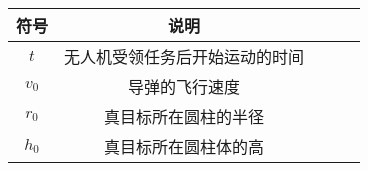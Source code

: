 \documentclass[../main.tex]{subfiles}
\begin{document}




\begin{table}[H]
\centering
\tabcolsep=2cm%
\begin{tabular}{ccccc}
\toprule[1.5pt]
符号 & 说明  \\ 
\midrule[1pt]
$t$            & 无人机受领任务后开始运动的时间            \\
$ v_0 $        & 导弹的飞行速度                          \\
$r_0$          &真目标所在圆柱的半径                      \\
$h_0$          &真目标所在圆柱体的高                      \\
\bottomrule[1.5pt]
\end{tabular}
\end{table}
\end{document}
